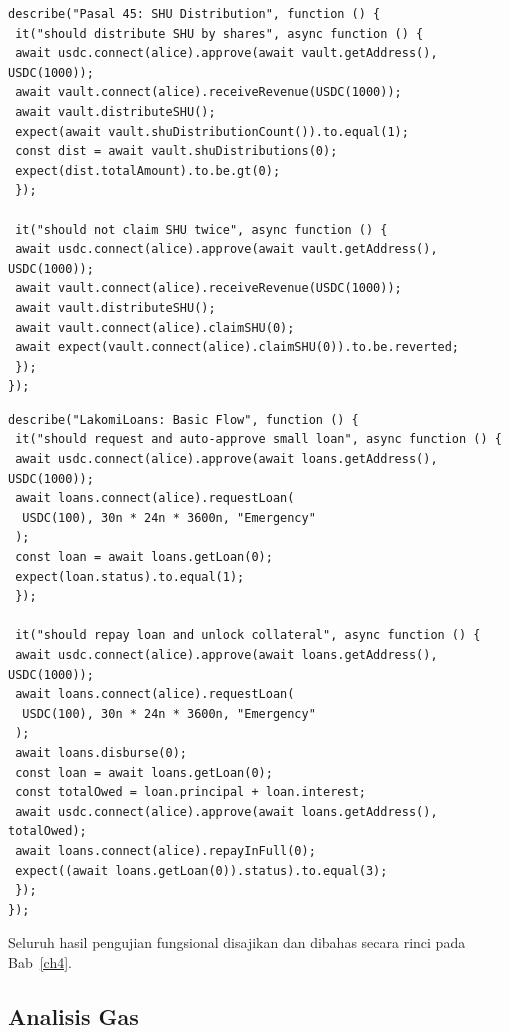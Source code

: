 \begin{lstlisting}[language={}, caption={Skrip Pengujian: Distribusi SHU (Pasal 45(1--2) UU 25/1992)}, label={lst:test-shu}, basicstyle=\ttfamily\scriptsize, breaklines=true]
describe("Pasal 45: SHU Distribution", function () {
 it("should distribute SHU by shares", async function () {
 await usdc.connect(alice).approve(await vault.getAddress(), USDC(1000));
 await vault.connect(alice).receiveRevenue(USDC(1000));
 await vault.distributeSHU();
 expect(await vault.shuDistributionCount()).to.equal(1);
 const dist = await vault.shuDistributions(0);
 expect(dist.totalAmount).to.be.gt(0);
 });

 it("should not claim SHU twice", async function () {
 await usdc.connect(alice).approve(await vault.getAddress(), USDC(1000));
 await vault.connect(alice).receiveRevenue(USDC(1000));
 await vault.distributeSHU();
 await vault.connect(alice).claimSHU(0);
 await expect(vault.connect(alice).claimSHU(0)).to.be.reverted;
 });
});
\end{lstlisting}

\begin{lstlisting}[language={}, caption={Skrip Pengujian: Pinjaman (Pasal 44 UU 25/1992 dan Permenkop 8/2023)}, label={lst:test-loan}, basicstyle=\ttfamily\scriptsize, breaklines=true]
describe("LakomiLoans: Basic Flow", function () {
 it("should request and auto-approve small loan", async function () {
 await usdc.connect(alice).approve(await loans.getAddress(), USDC(1000));
 await loans.connect(alice).requestLoan(
  USDC(100), 30n * 24n * 3600n, "Emergency"
 );
 const loan = await loans.getLoan(0);
 expect(loan.status).to.equal(1);
 });

 it("should repay loan and unlock collateral", async function () {
 await usdc.connect(alice).approve(await loans.getAddress(), USDC(1000));
 await loans.connect(alice).requestLoan(
  USDC(100), 30n * 24n * 3600n, "Emergency"
 );
 await loans.disburse(0);
 const loan = await loans.getLoan(0);
 const totalOwed = loan.principal + loan.interest;
 await usdc.connect(alice).approve(await loans.getAddress(), totalOwed);
 await loans.connect(alice).repayInFull(0);
 expect((await loans.getLoan(0)).status).to.equal(3);
 });
});
\end{lstlisting}

Seluruh hasil pengujian fungsional disajikan dan dibahas secara rinci pada Bab~\ref{ch4}.

\subsection{Analisis Gas}

